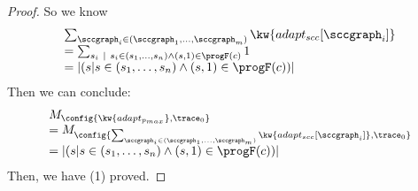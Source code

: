 \begin{proof}
  So we know
  \[
    \begin{array}{l}
      \sum_{\sccgraph_i \in (\sccgraph_1, \ldots, \sccgraph_m)} \kw{adapt_{scc}[\sccgraph_i]} 
    \\ =  \sum_{s_i ~\vert~ s_i \in (s_1, \ldots, s_n) \land (s, 1) \in \progF(c)} 1
     \\
     = |(s | s \in (s_1, \ldots, s_n) \land (s, 1) \in \progF(c))|
    \end{array}
  \]
  Then we can conclude:
  \[
    \begin{array}{l}
      M_{\config{\kw{adapt_{p_{max}}}, \trace_0}} 
    \\= 
    M_{\config{\sum_{\sccgraph_i \in (\sccgraph_1, \ldots, \sccgraph_m)} \kw{adapt_{scc}[\sccgraph_i]},
    \trace_0}}
    \\= |(s | s \in (s_1, \ldots, s_n) \land (s, 1) \in \progF(c))|
  \end{array}
  \]
Then, we have (1) proved.
\end{proof}